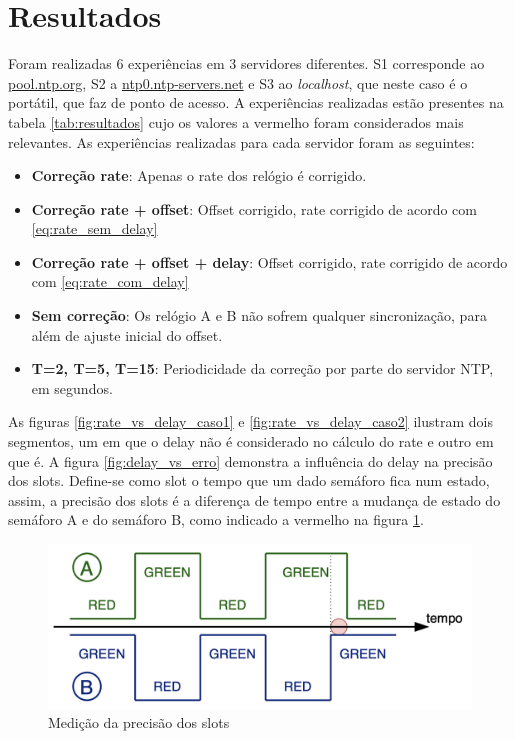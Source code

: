 \section{Resultados} \label{sec:resultados}

    Foram realizadas 6 experiências em 3 servidores diferentes. S1 corresponde ao \url{pool.ntp.org}, S2 a \url{ntp0.ntp-servers.net} e S3 ao \textit{localhost}, que neste caso é o portátil, que faz de ponto de acesso. A experiências realizadas estão presentes na tabela \ref{tab:resultados} cujo os valores a vermelho foram considerados mais relevantes. As experiências realizadas para cada servidor foram as seguintes:
    
    \begin{itemize}
        \item \textbf{Correção rate}: Apenas o rate dos relógio é corrigido.
        \item \textbf{Correção rate + offset}: Offset corrigido, rate corrigido de acordo com \ref{eq:rate_sem_delay}
        \item \textbf{Correção rate + offset + delay}: Offset corrigido, rate corrigido de acordo com \ref{eq:rate_com_delay}
        \item \textbf{Sem correção}: Os relógio A e B não sofrem qualquer sincronização, para além de ajuste inicial do offset.
        \item \textbf{T=2, T=5, T=15}: Periodicidade da correção por parte do servidor NTP, em segundos.
    \end{itemize}
    

     
    As figuras \ref{fig:rate_vs_delay_caso1} e \ref{fig:rate_vs_delay_caso2} ilustram dois segmentos, um em que o delay não é considerado no cálculo do rate e outro em que é. A figura \ref{fig:delay_vs_erro} demonstra a influência do delay na precisão dos slots. Define-se como slot o tempo que um dado semáforo fica num estado, assim, a precisão dos slots é a diferença de tempo entre a mudança de estado do semáforo A e do semáforo B, como indicado a vermelho na figura \ref{fig:explicacaoSlots}. 

    \begin{figure}[h]
        \centering
        \includegraphics[width=0.7\linewidth]{figures/explicacaoSlots.png}
        \caption{Medição da precisão dos slots}
        \label{fig:explicacaoSlots}
    \end{figure}


